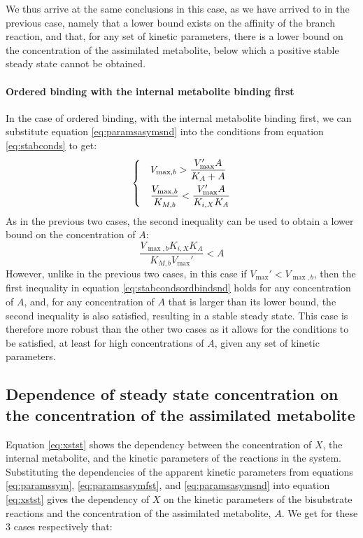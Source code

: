   We thus arrive at the same conclusions in this case, as we have arrived to in the previous case, namely that a lower bound exists on the affinity of the branch reaction, and that, for any set of kinetic parameters, there is a lower bound on the concentration of the assimilated metabolite, below which a positive stable steady state cannot be obtained.

  \paragraph{Ordered binding with the internal metabolite binding first}
  In the case of ordered binding, with the internal metabolite binding first, we can substitute equation \ref{eq:paramsasymsnd} into the conditions from equation \ref{eq:stabconds} to get:
  \begin{equation}
    \label{eq:stabcondsordbindsnd}
    \begin{dcases}
      & V_{\max,b}>\frac{V_{\max}'A}{K_A+A} \\
      & \frac{V_{\max,b}}{K_{M,b}}<\frac{V_{\max}'A}{K_{i,X}K_A}
    \end{dcases}
  \end{equation}
  As in the previous two cases, the second inequality can be used to obtain a lower bound on the concentration of $A$:
  \begin{equation}
      \label{eq:assimlowerboundasym}
    \frac{V_{\max,b}K_{i,X}K_A}{K_{M,b}V_{\max}'}<A
  \end{equation}
  However, unlike in the previous two cases, in this case if $V_{\max}'<V_{\max,b}$, then the first inequality in equation \ref{eq:stabcondsordbindsnd} holds for any concentration of $A$, and, for any concentration of $A$ that is larger than its lower bound, the second inequality is also satisfied, resulting in a stable steady state.
  This case is therefore more robust than the other two cases as it allows for the conditions to be satisfied, at least for high concentrations of $A$, given any set of kinetic parameters.
  \subsection{Dependence of steady state concentration on the concentration of the assimilated metabolite}
  Equation \ref{eq:xstst} shows the dependency between the concentration of $X$, the internal metabolite, and the kinetic parameters of the reactions in the system.
  Substituting the dependencies of the apparent kinetic parameters from equations \ref{eq:paramssym}, \ref{eq:paramsasymfst}, and \ref{eq:paramsasymsnd} into equation \ref{eq:xstst} gives the dependency of $X$ on the kinetic parameters of the bisubstrate reactions and the concentration of the assimilated metabolite, $A$.
  We get for these 3 cases respectively that:

